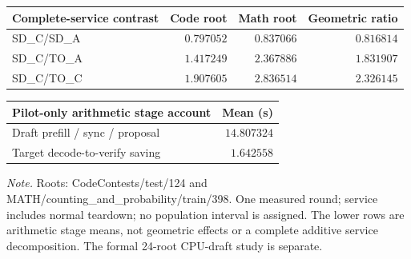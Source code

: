 \begingroup
\fontsize{8.7}{10.5}\selectfont
\setlength{\tabcolsep}{3.5pt}\renewcommand{\arraystretch}{1.03}
\noindent
\begin{tabularx}{\linewidth}{@{}>{\raggedright\arraybackslash}Xrrr@{}}
\toprule
Complete-service contrast & Code root & Math root & Geometric ratio\\
\midrule
SD\_C/SD\_A & $0.797052$ & $0.837066$ & $0.816814$\\
SD\_C/TO\_A & $1.417249$ & $2.367886$ & $1.831907$\\
SD\_C/TO\_C & $1.907605$ & $2.836514$ & $2.326145$\\
\bottomrule
\end{tabularx}\par\smallskip\noindent
\begin{tabularx}{\linewidth}{@{}>{\raggedright\arraybackslash}Xr@{}}
\toprule
Pilot-only arithmetic stage account & Mean (s)\\
\midrule
Draft prefill / sync / proposal & $14.807324$\\
Target decode-to-verify saving & $1.642558$\\
\bottomrule
\end{tabularx}
\par\smallskip
\fontsize{8}{9.6}\selectfont\raggedright
\textit{Note.} Roots: CodeContests/test/124 and MATH/counting\_and\_probability/train/398. One measured round; service includes normal teardown; no population interval is assigned. The lower rows are arithmetic stage means, not geometric effects or a complete additive service decomposition. The formal 24-root CPU-draft study is separate.
\par\endgroup
